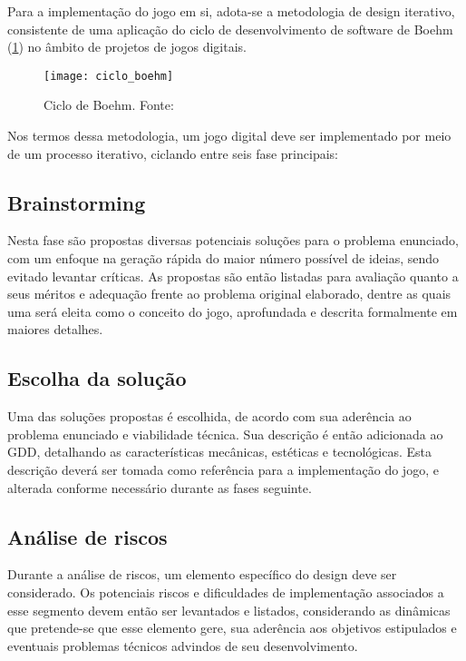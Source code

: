 Para a implementação do jogo em si, adota-se a metodologia de design iterativo, consistente de uma aplicação do ciclo de desenvolvimento de software de Boehm (\ref{fig:ciclo-boehm}) no âmbito de projetos de jogos digitais.

\begin{figure}[ht]
	\centering
	\texttt{[image: ciclo\_boehm]}
	\caption{Ciclo de Boehm. Fonte: \cite{schell:2010:art_game_design}}
	\label{fig:ciclo-boehm}
\end{figure}

Nos termos dessa metodologia, um jogo digital deve ser implementado por meio de um processo iterativo, ciclando entre seis fase principais:

\subsection{Brainstorming}\label{subsec-met-brainstorming}

Nesta fase são propostas diversas potenciais soluções para o problema enunciado, com um enfoque na geração rápida do maior número possível de ideias, sendo evitado levantar críticas. As propostas são então listadas para avaliação quanto a seus méritos e adequação frente ao problema original elaborado, dentre as quais uma será eleita como o conceito do jogo, aprofundada e descrita formalmente em maiores detalhes.

\subsection{Escolha da solução}\label{subsec-met-escolha-solucao}

Uma das soluções propostas é escolhida, de acordo com sua aderência ao problema enunciado e viabilidade técnica. Sua descrição é então adicionada ao GDD, detalhando as características mecânicas, estéticas e tecnológicas. Esta descrição deverá ser tomada como referência para a implementação do jogo, e alterada conforme necessário durante as fases seguinte.

\subsection{Análise de riscos}\label{subsec-met-analise-riscos}

Durante a análise de riscos, um elemento específico do design deve ser considerado. Os potenciais riscos e dificuldades de implementação associados a esse segmento devem então ser levantados e listados, considerando as dinâmicas que pretende-se que esse elemento gere, sua aderência aos objetivos estipulados e eventuais problemas técnicos advindos de seu desenvolvimento.

